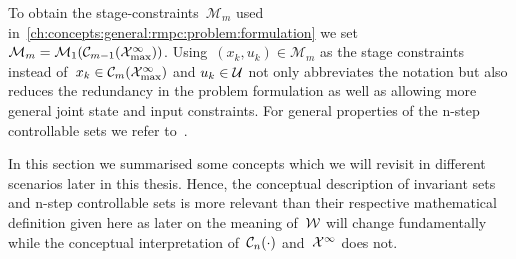 %
To obtain the stage-constraints~$\mathcal M_m$ used in~\eqref{ch:concepts:general:rmpc:problem:formulation} we set $\mathcal M_m=\mathcal M_1(\mathcal C_{m-1}(\mathcal X^\infty_{\max}))$.
%
Using~$(x_k,u_k)\in\mathcal M_m$ as the stage constraints instead of~$x_k\in\mathcal C_m(\mathcal X^\infty_{\max})$ and $u_k\in\mathcal U$ not only abbreviates the notation but also reduces the redundancy in the problem formulation as well as allowing more general joint state and input constraints.
%
For general properties of the n-step controllable sets we refer to~\cite{Rakovic:2009}.
%
%
%
%
%
\begin{rem}
In this section we summarised some concepts which we will revisit in different scenarios later in this thesis. 
%
Hence, the conceptual description of invariant sets and n-step controllable sets is more relevant than their respective mathematical definition given here as later on the meaning of~$\mathcal W$ will change fundamentally while the conceptual interpretation of~$\mathcal C_n(\cdot)$ and~$\mathcal X^\infty$ does not.
\end{rem}